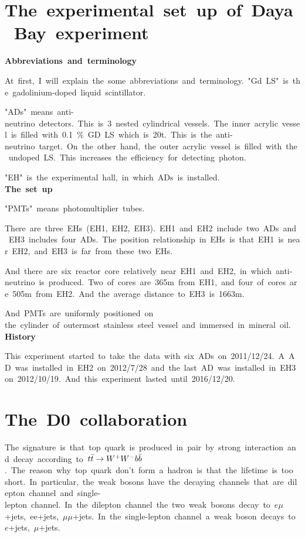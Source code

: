 \section{The\ experimental\ set\ up\ of\ Daya\ Bay\ experiment}
\textbf{Abbreviations\ and\ terminology}

At\ first,\ I\ will\ explain\ the\ some\ abbreviations\ and\ terminology.\ "Gd\ LS"\ is\ the\ gadolinium-doped\ liquid\ scintillator.

"ADs"\ means\ anti-neutrino\ detectors.\ This\ is\ 3\ nested\ cylindrical\ vessels.\ The\ inner\ acrylic\ vessel\ is\ filled\ with\ 0.1\ \%\ GD\ LS\ which\ is\ 20t.\ This\ is\ the\ anti-neutrino\ target.\ On\ the\ other\ hand,\ the\ outer\ acrylic\ vessel\ is\ filled\ with\ the\ undoped\ LS.\ This\ increases\ the\ efficiency\ for\ detecting\ photon.

"EH"\ is\ the\ experimental\ hall,\ in\ which\ ADs\ is\ installed.\\
\textbf{The\ set\ up}

"PMTs"\ means\ photomultiplier\ tubes.

There\ are\ three\ EHs\ (EH1,\ EH2,\ EH3).\ EH1\ and\ EH2\ include\ two\ ADs\ and\ EH3\ includes\ four\ ADs.\ The\ position\ relationship\ in\ EHs\ is\ that\ EH1\ is\ near\ EH2,\ and\ EH3\ is\ far\ from\ these\ two\ EHs.\ 

And\ there\ are\ six\ reactor\ core\ relatively\ near\ EH1\ and\ EH2,\ in\ which\ anti-neutrino\ is\ produced.\ Two\ of\ cores\ are\ 365m\ from\ EH1,\ and\ four\ of\ cores\ are\ 505m\ from\ EH2.\ And\ the\ average\ distance\ to\ EH3\ is\ 1663m.

And\ PMTs\ are\ uniformly\ positioned\ on the\ cylinder\ of\ outermost\ stainless\ steel\ vessel\ and\ immersed\ in\ mineral\ oil.\\
\textbf{History}

This\ experiment\ started\ to\ take\ the\ data\ with\ six\ ADs\ on\ 2011/12/24.\ A\ AD\ was\ installed\ in\ EH2\ on\ 2012/7/28\ and\ the\ last\ AD\ was\ installed\ in\ EH3\ on\ 2012/10/19.\ And\ this\ experiment\ lasted\ until\ 2016/12/20.

\section{The\ D0\ collaboration}
The\ signature\ is\ that\ top\ quark\ is\ produced\ in\ pair\ by\ strong\ interaction\ and\ decay\ according\ to\ $t\Bar{t}\to W^+W^-b\Bar{b}$.\ The\ reason\ why\ top\ quark\ don't\ form\ a\ hadron\ is\ that\ the\ lifetime\ is\ too\ short.\ In\ particular,\ the\ weak\ bosons\ have\ the\ decaying\ channels\ that\ are\ dilepton\ channel\ and\ single-lepton\ channel.\ In\ the\ dilepton\ channel\ the\ two\ weak\ bosons\ decay\ to\ $e\mu$+jets,\ ee+jets,\ $\mu\mu$+jets.\ In\ the\ single-lepton\ channel\ a\ weak\ boson\ decays\ to\ $e$+jets,\ $\mu$+jets.

